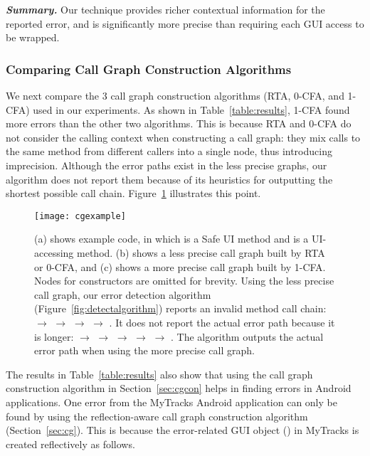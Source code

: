 \vspace{1mm}

\noindent \textbf{\textit{Summary.}} Our technique provides
richer contextual information for the reported error, and 
is significantly more precise than requiring each GUI
access to be wrapped.

\subsubsection{Comparing Call Graph Construction Algorithms}
\label{sec:reflectionaware}

We next compare the 3 call graph construction algorithms (RTA, 0-CFA, and 1-CFA)
used in our experiments. As shown in Table~\ref{table:results},  1-CFA found
more errors than the other two algorithms. This
is because RTA and 0-CFA do not consider the calling context when
constructing a call graph:  they
mix calls to the same method from different callers into a single node, thus
introducing imprecision. Although the error paths exist in
the less precise graphs, our algorithm does not report them because of its heuristics
for outputting the shortest possible call chain. Figure~\ref{fig:ex} illustrates this point.

\begin{figure}[t]
  \centering
  \texttt{[image: cgexample]}
  \vspace*{-5.0ex}\caption {{\label{fig:ex} (a) shows example code, in which
 is a Safe UI method and  is a UI-accessing method.
(b) shows a less precise call graph built by RTA or 0-CFA, and (c) shows a more
precise call graph built by 1-CFA\@. Nodes for constructors are omitted for brevity.
\newline
Using the less precise call graph, our error
detection algorithm (Figure~\ref{fig:detectalgorithm}) reports an invalid method
call chain: 
$\rightarrow$  $\rightarrow$  $\rightarrow$ 
$\rightarrow$ . It does not report
the actual error path because it is longer:  $\rightarrow$  $\rightarrow$
 $\rightarrow$  $\rightarrow$  $\rightarrow$ .
The algorithm outputs the actual error path when using the more precise call graph.
}}
\end{figure}



The results in Table~\ref{table:results} also show that using the
call graph construction algorithm in Section~\ref{sec:cgcon}
helps in finding errors in Android applications. One error from the MyTracks Android application
can only be found by using the reflection-aware call graph construction algorithm (Section~\ref{sec:cg}).
This is because the error-related GUI object () in MyTracks is created
reflectively as follows.

